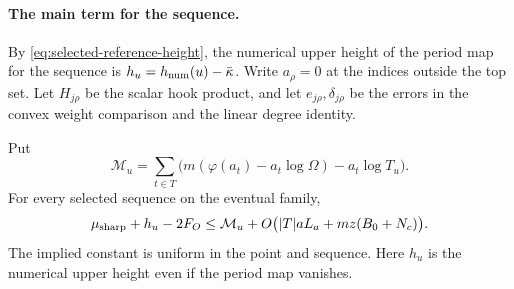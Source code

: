 \paragraph{The main term for the sequence.}
By \eqref{eq:selected-reference-height}, the numerical
upper height of the period map for the sequence is
\(h_u=h_{\rm num}(u)-\bar\kappa\).
Write \(a_\rho=0\) at the indices outside the top set.
Let \(H_{j\rho}\) be the scalar hook product, and let
\(e_{j\rho},\delta_{j\rho}\) be the errors in the convex
weight comparison and the linear degree identity.

\begin{proposition}\label{prop:sequence-division}
Put
\[
 \mathcal M_u=\sum_{t\in T}
      \bigl(m(\varphi(a_t)-a_t\log\Omega)-a_t\log T_u\bigr).
\]
For every selected sequence on the eventual family,
\begin{equation}\label{eq:selected-word-division}
 \mu_{\rm sharp}+h_u-2F_O
 \le \mathcal M_u+O\bigl(|T|aL_a+m z(B_0+N_c)\bigr).
\end{equation}
The implied constant is uniform in the point and sequence.
Here \(h_u\) is the numerical upper height even if the period map vanishes.
\end{proposition}

